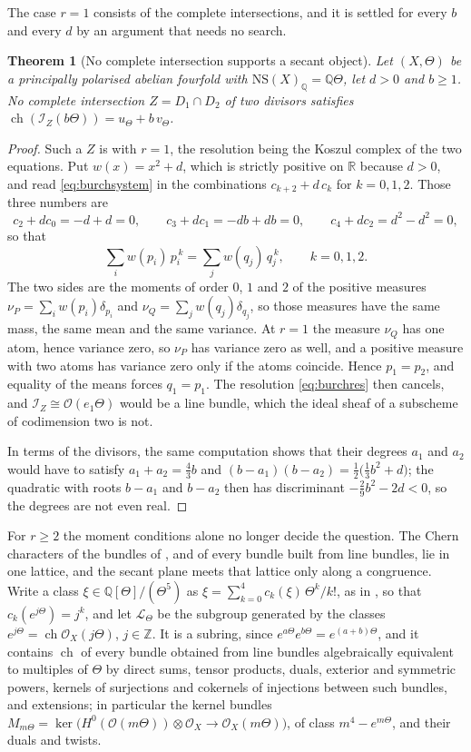 \documentclass[11pt,reqno]{amsart}
\theoremstyle{plain}
\newtheorem{theorem}{Theorem}[section]
\theoremstyle{definition}
\theoremstyle{remark}
\newcommand{\QQ}{\mathbb{Q}}
\newcommand{\ZZ}{\mathbb{Z}}
\newcommand{\RR}{\mathbb{R}}
\newcommand{\cO}{\mathcal{O}}
\newcommand{\cL}{\mathcal{L}}
\newcommand{\cI}{\mathcal{I}}
\newcommand{\NS}{\mathrm{NS}}
\DeclareMathOperator{\ch}{ch}
\begin{document}
The case $r=1$ consists of the complete intersections, and it is settled for
every $b$ and every $d$ by an argument that needs no search.

\begin{theorem}[No complete intersection supports a secant object]%
\label{thm:noci}
Let $(X,\Theta)$ be a principally polarised abelian fourfold with
$\NS(X)_{\QQ}=\QQ\Theta$, let $d>0$ and $b\ge1$. No complete intersection
$Z=D_{1}\cap D_{2}$ of two divisors satisfies
$\ch(\cI_{Z}(b\Theta))=u_{\Theta}+b\,v_{\Theta}$.
\end{theorem}

\begin{proof}
Such a $Z$ is  with $r=1$, the resolution being the Koszul
complex of the two equations. Put $w(x)=x^{2}+d$, which is strictly positive
on $\RR$ because $d>0$, and read \eqref{eq:burchsystem} in the combinations
$c_{k+2}+d\,c_{k}$ for $k=0,1,2$. Those three numbers are
\[
  c_{2}+dc_{0}=-d+d=0,\qquad
  c_{3}+dc_{1}=-db+db=0,\qquad
  c_{4}+dc_{2}=d^{2}-d^{2}=0,
\]
so that
\[
  \sum_{i}w(p_{i})\,p_{i}^{\,k}=\sum_{j}w(q_{j})\,q_{j}^{\,k},
  \qquad k=0,1,2 .
\]
The two sides are the moments of order $0$, $1$ and $2$ of the positive
measures $\nu_{P}=\sum_{i}w(p_{i})\delta_{p_{i}}$ and
$\nu_{Q}=\sum_{j}w(q_{j})\delta_{q_{j}}$, so those measures have the same
mass, the same mean and the same variance. At $r=1$ the measure $\nu_{Q}$ has
one atom, hence variance zero, so $\nu_{P}$ has variance zero as well, and a
positive measure with two atoms has variance zero only if the atoms coincide.
Hence $p_{1}=p_{2}$, and equality of the means forces $q_{1}=p_{1}$. The
resolution \eqref{eq:burchres} then cancels, and $\cI_{Z}\cong\cO(e_{1}\Theta)$
would be a line bundle, which the ideal sheaf of a subscheme of codimension
two is not.

In terms of the divisors, the same computation shows that their degrees
$a_{1}$ and $a_{2}$ would have to satisfy $a_{1}+a_{2}=\tfrac43b$ and
$(b-a_{1})(b-a_{2})=\tfrac12\bigl(\tfrac13b^{2}+d\bigr)$; the quadratic with
roots $b-a_{1}$ and $b-a_{2}$ then has discriminant $-\tfrac29b^{2}-2d<0$, so
the degrees are not even real.
\end{proof}

For $r\ge2$ the moment conditions alone no longer decide the question. The
Chern characters of the bundles of , and of every bundle
built from line bundles, lie in one lattice, and the secant plane meets that
lattice only along a congruence. Write a class $\xi\in\QQ[\Theta]/(\Theta^{5})$
as $\xi=\sum_{k=0}^{4}c_{k}(\xi)\,\Theta^{k}/k!$, as in
, so that $c_{k}(e^{j\Theta})=j^{k}$, and let
$\cL_{\Theta}$ be the subgroup generated by the classes
$e^{j\Theta}=\ch\cO_{X}(j\Theta)$, $j\in\ZZ$. It is a subring, since
$e^{a\Theta}e^{b\Theta}=e^{(a+b)\Theta}$, and it contains $\ch$ of every
bundle obtained from line bundles algebraically equivalent to multiples of
$\Theta$ by direct sums, tensor products, duals, exterior and symmetric
powers, kernels of surjections and cokernels of injections between such
bundles, and extensions;
in particular the kernel bundles
$M_{m\Theta}=\ker\bigl(H^{0}(\cO(m\Theta))\otimes\cO_{X}\to\cO_{X}(m\Theta)\bigr)$,
of class $m^{4}-e^{m\Theta}$, and their duals and twists.
\end{document}
